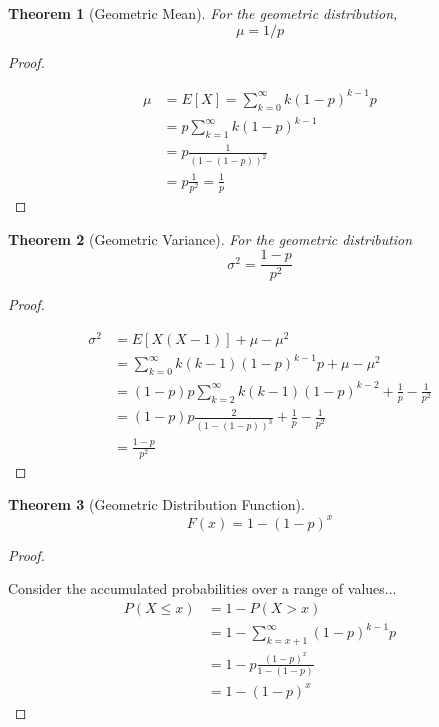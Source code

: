 \documentclass[10pt,]{book}
\theoremstyle{plain}
\newtheorem{theorem}{Theorem}[section]
\theoremstyle{definition}
\theoremstyle{definition}
\theoremstyle{definition}
\numberwithin{equation}{section}
\newcommand{\gt}{ > }
\begin{document}
\begin{theorem}[{Geometric Mean}]\label{theorem-36}
For the geometric distribution, 
			\begin{equation*}\mu = 1/p\end{equation*}\end{theorem}
\begin{proof}\hypertarget{proof-37}{}
 
			\begin{align*}
\mu & = E[X] = \sum_{k=0}^{\infty} {k(1-p)^{k-1}p}\\
 & = p \sum_{k=1}^{\infty} {k(1-p)^{k-1}}\\
 & = p \frac{1}{(1-(1-p))^2}\\
 & = p \frac{1}{p^2} = \frac{1}{p}
\end{align*}
\end{proof}
\begin{theorem}[{Geometric Variance}]\label{theorem-37}
For the geometric distribution 
				\begin{equation*}\sigma^2  = \frac{1-p}{p^2}\end{equation*}\end{theorem}
\begin{proof}\hypertarget{proof-38}{}
 
			\begin{align*}
\sigma^2 & = E[X(X-1)] + \mu - \mu^2 \\
 & = \sum_{k=0}^{\infty} {k(k-1)(1-p)^{k-1}p} + \mu - \mu^2 \\
 & = (1-p)p \sum_{k=2}^{\infty} {k(k-1)(1-p)^{k-2}} + \frac{1}{p} - \frac{1}{p^2}\\
 & = (1-p)p \frac{2}{(1-(1-p))^3} + \frac{1}{p} - \frac{1}{p^2}\\
 & = \frac{1-p}{p^2}
\end{align*}
\end{proof}
\begin{theorem}[{Geometric Distribution Function}]\label{theorem-38}
\begin{equation*}F(x) =  1- (1-p)^{x}\end{equation*}\end{theorem}
\begin{proof}\hypertarget{proof-39}{}
 Consider the accumulated probabilities over a range of values...
		\begin{align*}
 P(X \le x) & = 1 - P(X \gt x)\\
 & = 1- \sum_{k={x+1}}^{\infty} {(1-p)^{k-1}p}\\
 & = 1- p \frac{(1-p)^{x}}{1-(1-p)}\\
 & = 1- (1-p)^{x}
\end{align*}
\end{proof}
\end{document}
